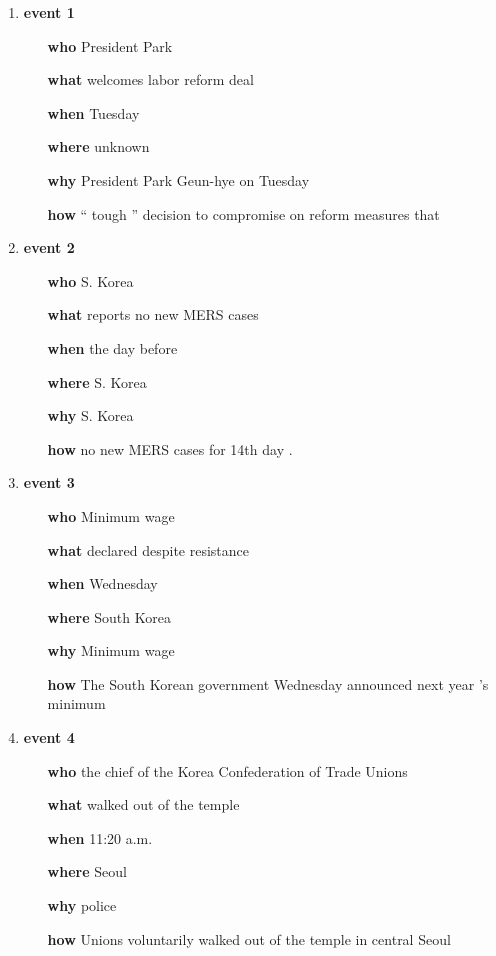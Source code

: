 \begin{enumerate}
    \item \textbf{event 1}
        \begin{enumerate}
        \item[\textbf{who}] President Park
        \item[\textbf{what}] welcomes labor reform deal
        \item[\textbf{when}] Tuesday
        \item[\textbf{where}] unknown
        \item[\textbf{why}] President Park Geun-hye on Tuesday
        \item[\textbf{how}] “ tough ” decision to compromise on reform measures that
        \end{enumerate}
\item \textbf{	event		2	}								
\begin{enumerate}												
\item[\textbf{	who	}]	S.	Korea								
\item[\textbf{	what	}]	reports	no	new	MERS	cases					
\item[\textbf{	when	}]	the	day	before							
\item[\textbf{	where	}]	S.	Korea								
\item[\textbf{	why	}]	S.	Korea								
\item[\textbf{	how	}]	no	new	MERS	cases	for	14th	day	.		
\end{enumerate}												
\item \textbf{	event		3	}								
\begin{enumerate}												
\item[\textbf{	who	}]	Minimum	wage								
\item[\textbf{	what	}]	declared	despite	resistance							
\item[\textbf{	when	}]	Wednesday									
\item[\textbf{	where	}]	South	Korea								
\item[\textbf{	why	}]	Minimum	wage								
\item[\textbf{	how	}]	The	South	Korean	government	Wednesday	announced	next	year	’s	minimum
\end{enumerate}												
\item \textbf{	event		4	}								
\begin{enumerate}												
\item[\textbf{	who	}]	the	chief	of	the	Korea	Confederation	of	Trade	Unions	
\item[\textbf{	what	}]	walked	out	of	the	temple					
\item[\textbf{	when	}]	11:20	a.m.								
\item[\textbf{	where	}]	Seoul									
\item[\textbf{	why	}]	police									
\item[\textbf{	how	}]	Unions	voluntarily	walked	out	of	the	temple	in	central	Seoul
\end{enumerate}												
\end{enumerate}
